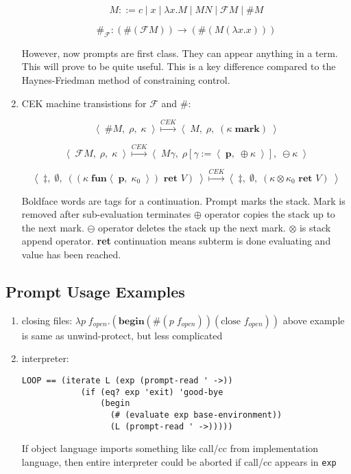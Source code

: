 \documentclass[letterpaper]{llncs}
\newcommand{\F}{ \ensuremath{ \mathcal{F} } }
\newcommand{\cek}[3]{ \ensuremath{ \left\langle \; #1, \; #2, \; #3 \; \right\rangle } }
\newcommand{\cekstep}{ \ensuremath{ \stackrel{CEK}{\longmapsto} } }
\newcommand{\clos}[2]{ \ensuremath{ \left\langle \; #1, \; #2 \; \right\rangle } }
\begin{document}
\begin{enumerate}
	$$M ::= c \mid x \mid \lambda x.M \mid M N \mid \F M \mid \# M$$

	$$\#_\F: (\# (\F M)) \rightarrow (\# (M (\lambda x.x)))$$
	
	However, now prompts are first class. They can appear anything in a term. This will prove to be quite useful. This is a key difference compared to the Haynes-Friedman method of constraining control.
	
	\item CEK machine transistions for $\F$ and \#:
	
	$$\cek{ \# M }{ \rho }{ \kappa } 
	      \cekstep 
	  \cek{ M }{ \rho }{ (\kappa \; \textbf{mark}) }$$
	
	$$\cek{ \F M }{ \rho }{ \kappa } 
	      \cekstep 
	  \cek{ M \gamma }{ \rho[\gamma := \clos{ \textbf{p} }{ \oplus \kappa }] }{ \ominus \kappa }$$
	  
	$$\cek{ \ddagger }{ \emptyset }{ ((\kappa \; \textbf{fun} \clos{\textbf{p}}{\kappa_0}) \textbf{ ret } V) } 
	      \cekstep
	  \cek{ \ddagger }{ \emptyset }{ (\kappa \otimes \kappa_0 \textbf{ ret } V) }$$
	
	Boldface words are tags for a continuation. Prompt marks the stack. Mark is removed after sub-evaluation terminates $\oplus$ operator copies the stack up to the next mark. $\ominus$ operator deletes the stack up the next mark. $\otimes$ is stack append operator. \textbf{ret} continuation means subterm is done evaluating and value has been reached.
	

\end{enumerate}


\subsection*{Prompt Usage Examples}
\begin{enumerate}
	\item closing files: $\lambda p \; f_{open}.(\textbf{begin} (\#(p \; f_{open})) (\textrm{close } f_{open}))$
	above example is same as unwind-protect, but less complicated
	\item interpreter: 
\begin{verbatim}
LOOP == (iterate L (exp (prompt-read ' ->))
	        (if (eq? exp 'exit) 'good-bye
	            (begin
	              (# (evaluate exp base-environment))
	              (L (prompt-read ' ->)))))
\end{verbatim}
If object language imports something like call/cc from implementation language, then entire interpreter could be aborted if call/cc appears in \texttt{exp}
\end{enumerate}
\end{document}
